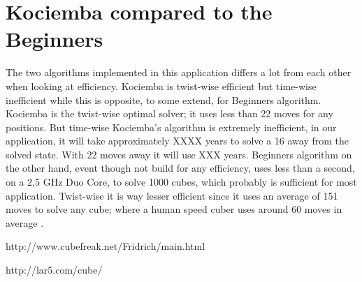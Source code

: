 \section{Kociemba compared to the Beginners}
The two algorithms implemented in this application differs a lot from each other when looking at efficiency. 
Kociemba is twist-wise efficient but time-wise inefficient while this is opposite, to some extend, for Beginners algorithm. 
Kociemba is the twist-wise optimal solver; it uses less than 22 moves for any positions. 
But time-wise Kociemba's algorithm is extremely inefficient, in our application, it will take approximately XXXX years to solve a \cube{} 16 \twist{} away from the solved state. 
With 22 moves away it will use XXX years. 
Beginners algorithm on the other hand, event though not build for any efficiency, uses less than a second, on a 2,5 GHz Duo Core, to solve 1000 cubes, which probably is sufficient for most application. 
Twist-wise it is way lesser efficient since it uses an average of 151 moves to solve any cube; where a human speed cuber uses around 60 moves in average \cite{} \cite{}.


http://www.cubefreak.net/Fridrich/main.html

http://lar5.com/cube/